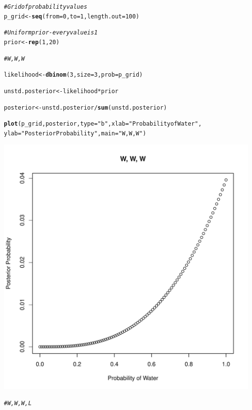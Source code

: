 \documentclass[12pt]{article}\usepackage[]{graphicx}\usepackage[]{color}
\makeatletter
\def\maxwidth{ %
  \ifdim\Gin@nat@width>\linewidth
    \linewidth
  \else
    \Gin@nat@width
  \fi
}
\newcommand{\hlnum}[1]{\textcolor[rgb]{0.686,0.059,0.569}{#1}}%
\newcommand{\hlstr}[1]{\textcolor[rgb]{0.192,0.494,0.8}{#1}}%
\newcommand{\hlcom}[1]{\textcolor[rgb]{0.678,0.584,0.686}{\textit{#1}}}%
\newcommand{\hlopt}[1]{\textcolor[rgb]{0,0,0}{#1}}%
\newcommand{\hlstd}[1]{\textcolor[rgb]{0.345,0.345,0.345}{#1}}%
\newcommand{\hlkwb}[1]{\textcolor[rgb]{0.69,0.353,0.396}{#1}}%
\newcommand{\hlkwc}[1]{\textcolor[rgb]{0.333,0.667,0.333}{#1}}%
\newcommand{\hlkwd}[1]{\textcolor[rgb]{0.737,0.353,0.396}{\textbf{#1}}}%
\newenvironment{kframe}{%
 \def\at@end@of@kframe{}%
 \ifinner\ifhmode%
  \def\at@end@of@kframe{\end{minipage}}%
  \begin{minipage}{\columnwidth}%
 \fi\fi%
 \def\FrameCommand##1{\hskip\@totalleftmargin \hskip-\fboxsep
 \colorbox{shadecolor}{##1}\hskip-\fboxsep
     \hskip-\linewidth \hskip-\@totalleftmargin \hskip\columnwidth}%
 \MakeFramed {\advance\hsize-\width
   \@totalleftmargin\z@ \linewidth\hsize
   \@setminipage}}%
 {\par\unskip\endMakeFramed%
 \at@end@of@kframe}
\newenvironment{knitrout}{}{} %
\makeatother
\begin{document}
\begin{knitrout}
\color{fgcolor}\begin{kframe}
\begin{alltt}
\hlcom{#Grid of probability values}
\hlstd{p_grid} \hlkwb{<-} \hlkwd{seq}\hlstd{(}\hlkwc{from} \hlstd{=} \hlnum{0}\hlstd{,} \hlkwc{to} \hlstd{=} \hlnum{1}\hlstd{,} \hlkwc{length.out} \hlstd{=} \hlnum{100}\hlstd{)}

\hlcom{#Uniform prior - every value is 1}
\hlstd{prior} \hlkwb{<-} \hlkwd{rep}\hlstd{(}\hlnum{1}\hlstd{,} \hlnum{20}\hlstd{)}

\hlcom{#W, W, W}

\hlstd{likelihood} \hlkwb{<-} \hlkwd{dbinom}\hlstd{(}\hlnum{3}\hlstd{,} \hlkwc{size} \hlstd{=} \hlnum{3}\hlstd{,} \hlkwc{prob} \hlstd{= p_grid)}

\hlstd{unstd.posterior} \hlkwb{<-} \hlstd{likelihood} \hlopt{*} \hlstd{prior}

\hlstd{posterior} \hlkwb{<-} \hlstd{unstd.posterior}\hlopt{/}\hlkwd{sum}\hlstd{(unstd.posterior)}

\hlkwd{plot}\hlstd{(p_grid, posterior,} \hlkwc{type} \hlstd{=} \hlstr{"b"}\hlstd{,} \hlkwc{xlab} \hlstd{=} \hlstr{"Probability of Water"}\hlstd{,}
     \hlkwc{ylab} \hlstd{=} \hlstr{"Posterior Probability"}\hlstd{,} \hlkwc{main} \hlstd{=} \hlstr{"W, W, W"}\hlstd{)}
\end{alltt}
\end{kframe}
\includegraphics[width=\maxwidth]{figure/unnamed-chunk-2-1} 
\begin{kframe}\begin{alltt}
\hlcom{#W, W, W, L}


\end{alltt}
\end{kframe}
\end{knitrout}
\end{document}
